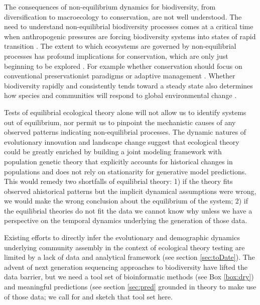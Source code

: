 \documentclass[12pt]{article}
\newcounter{Box}
\begin{document}
The consequences of non-equilibrium dynamics for biodiversity, from
diversification to macroecology to conservation, are not well
understood. The need to understand non-equilibrial biodiversity
processes comes at a critical time when anthropogenic pressures are
forcing biodiversity systems into states of rapid transition
\citep{Barnosky2012-qz}. The extent to which ecosystems are governed
by non-equilibrial processes has profound implications for
conservation, which are only just beginning to be explored
\citep{Wallington2005-kv}. For example whether conservation should
focus on conventional preservationist paradigms or adaptive management
\citep{Wallington2005-kv}. Whether biodiversity rapidly and
consistently tends toward a steady state also determines how species
and communities will respond to global environmental change
\citep{Barnosky2012-qz}.

Tests of equilibrial ecological theory alone will not allow us to
identify systems out of equilibrium, nor permit us to pinpoint the
mechanistic causes of any observed patterns indicating non-equilibrial
processes. The dynamic natures of evolutionary innovation and
landscape change suggest that ecological theory could be greatly
enriched by building a joint modeling framework with population
genetic theory that explicitly accounts for historical changes in
populations and does not rely on stationarity for generative model
predictions. This would remedy two shortfalls of equilibrial theory:
1) if the theory fits observed ahistorical patterns but the implicit
dynamical assumptions were wrong, we would make the wrong conclusion
about the equilibrium of the system; 2) if the equilibrial theories do
not fit the data we cannot know why unless we have a perspective on
the temporal dynamics underlying the generation of those data.

Existing efforts to directly infer the evolutionary and demographic
dynamics underlying community assembly in the context of ecological
theory testing are limited by a lack of data and analytical framework
(see section \ref{sec:toDate}).  The advent of next generation
sequencing approaches to biodiversity \citep{Yu2012, ji2013, tang2014,
  dodsworth2015} have lifted the data barrier, but we need a tool set
of bioinformatic methods (see Box \ref{box:dry}) and meaningful
predictions (see section \ref{sec:pred} grounded in theory
to make use of those data; we call for and sketch that tool set here.

% 
% 
\end{document}

